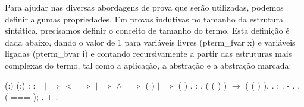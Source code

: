  Para ajudar nas diversas abordagens de prova que serão utilizadas, podemos definir
algumas propriedades. Em provas indutivas no tamanho da estrutura sintática, precisamos 
definir o conceito de tamanho do termo. Esta definição é dada abaixo, dando o valor de 1
para variáveis livres (pterm\_fvar x) e variáveis ligadas (pterm\_bvar i) e contando recursivamente
a partir das estruturas mais complexas do termo, tal como a aplicação, a abstração e a abstração
marcada: \begin{coqdoccode}
\coqdocemptyline
\coqdocnoindent
{}  (:) (:) :  :=\coqdoceol
\coqdocindent{1.00em}
  \coqdoceol
\coqdocindent{1.00em}
\ensuremath{|}      \ensuremath{\Rightarrow}  < \coqdoceol
\coqdocindent{1.00em}
\ensuremath{|}      \ensuremath{\Rightarrow} \coqdoceol
\coqdocindent{1.00em}
\ensuremath{|}    \ensuremath{\Rightarrow}    \ensuremath{\land}   \coqdoceol
\coqdocindent{1.00em}
\ensuremath{|}      \ensuremath{\Rightarrow}  ( ) \coqdoceol
\coqdocindent{1.00em}
\ensuremath{|}      \ensuremath{\Rightarrow}  ( ) \coqdoceol
\coqdocindent{1.00em}
.\coqdoceol
\coqdocemptyline
\coqdocnoindent
{} : \coqdockw{\ensuremath{\forall}}     ,   (  ( ) ) \ensuremath{\rightarrow}   (  ( ) ).\coqdoceol
\coqdocnoindent
{}.\coqdoceol
\coqdocindent{1.00em}
 ;  .\coqdoceol
\coqdocindent{1.00em}
-     .\coqdoceol
\coqdocindent{2.00em}
.  ( === ); .\coqdoceol
\coqdocindent{2.00em}
+  .\coqdoceol

\end{coqdoccode}
